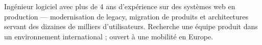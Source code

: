 
Ingénieur logiciel avec plus de 4 ans d'expérience sur des systèmes web en production --- modernisation de legacy, migration de produits et architectures servant des dizaines de milliers d'utilisateurs. Recherche une équipe produit dans un environnement international ; ouvert à une mobilité en Europe.
